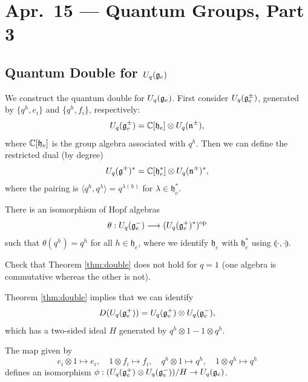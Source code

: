 \chapter{Apr.~15 --- Quantum Groups, Part 3}

\section{Quantum Double for \texorpdfstring{$U_q(\mathfrak{g}_e)$}{Uq(ge)}}

\begin{remark}
  We construct the quantum double for
  $U_q(\mathfrak{g}_e)$.
  First consider
  $U_q(\mathfrak{g}^{\pm}_e)$, generated by
  $\{q^h, e_i\}$
  and $\{q^h, f_i\}$, respectively:
  \[
    U_q(\mathfrak{g}^{\pm}_e)
    = \mathbb{C}[\mathfrak{h}_e]
    \otimes U_q(\mathfrak{n}^{\pm}),
  \]
  where $\mathbb{C}[\mathfrak{h}_e]$ is the group algebra
  associated with $q^h$. Then we can
  define the restricted dual
  (by degree)
  \[
    U_q(\mathfrak{g}^{\pm})^*
    = \mathbb{C}[\mathfrak{h}_e^*] \otimes U_q(\mathfrak{n}^{\pm})^*,
  \]
  where the pairing is
  $\langle q^h, q^{\lambda} \rangle = q^{\lambda(h)}$
  for $\lambda \in \mathfrak{h}_e^*$.
\end{remark}

\begin{theorem}\label{thm:double}
  There is an isomorphism of Hopf algebras
  \[
    \theta :
    U_q(\mathfrak{g}_e^-)
    \longrightarrow
    (U_q(\mathfrak{g}_e^+)^*)^{\mathrm{op}}
  \]
  such that
  $\theta(q^h) = q^h$
  for all $h \in \mathfrak{h}_e$,
  where we identify
  $\mathfrak{h}_e$ with $\mathfrak{h}_e^*$
  using $\llparenthesis \cdot, \cdot \rrparenthesis$.
\end{theorem}

\begin{example}
  Check that Theorem \ref{thm:double}
  does not hold for $q = 1$ (one algebra
  is commutative whereas the other is not).
\end{example}

\begin{theorem}
  Theorem \ref{thm:double} implies that
  we can identify
  \[
    D(U_q(\mathfrak{g}_e^+))
    = U_q(\mathfrak{g}_e^+) \otimes U_q(\mathfrak{g}_e^-),
  \]
  which has a two-sided ideal $H$ generated
  by $q^h \otimes 1 - 1 \otimes q^h$.
\end{theorem}

\begin{theorem}
  The map given by
  \[
    e_i \otimes 1 \mapsto e_i, \quad
    1 \otimes f_i \mapsto f_i, \quad
    q^h \otimes 1 \mapsto q^h, \quad
    1 \otimes q^h \mapsto q^{h}
  \]
  defines an isomorphism
  $\phi : (U_q(\mathfrak{g}_e^+) \otimes U_q(\mathfrak{g}_e^-)) / H \to U_q(\mathfrak{g}_e)$.
\end{theorem}

